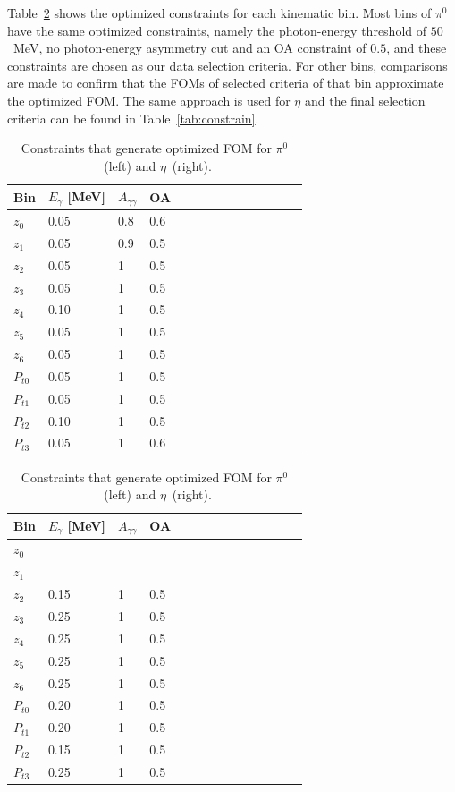 Table~\ref{tab:FOM} shows the optimized constraints for each kinematic bin. Most bins of $\pi^0$ have the same optimized constraints, namely the photon-energy threshold of $50$~MeV, no photon-energy asymmetry cut and an OA constraint of $0.5$, and these constraints are chosen as our data selection criteria. For other bins, comparisons are made to confirm that the FOMs of selected criteria of that bin approximate the optimized FOM. The same approach is used for $\eta$ and the final selection criteria can be found in Table~\ref{tab:constrain}.%
\begin{table}[t]
\begin{tabular}{|p{1.3cm}|l|l|l|l|l|l|l|l|l|l|l|l|l|}
\hline
Bin & $E_{\gamma}$ [MeV] & $A_{\gamma\gamma}$ & OA \\ \hline
$z_0$ & 0.05 & 0.8 & 0.6 \\\hline
$z_1$ & 0.05 & 0.9 & 0.5 \\\hline
$z_2$ & 0.05 & 1 & 0.5 \\\hline
$z_3$ & 0.05 & 1 & 0.5 \\\hline
$z_4$ & 0.10 & 1 & 0.5 \\\hline
$z_5$ & 0.05 & 1 & 0.5 \\\hline
$z_6$ & 0.05 & 1 & 0.5 \\\hline
$P_{t0}$ & 0.05 & 1 & 0.5 \\\hline
$P_{t1}$ & 0.05 & 1 & 0.5 \\\hline
$P_{t2}$ & 0.10 & 1 & 0.5 \\\hline
$P_{t3}$ & 0.05 & 1 & 0.6 \\\hline
\end{tabular}
\quad
\begin{tabular}{|p{1.3cm}|l|l|l|l|l|l|l|l|l|l|l|l|l|}
\hline
Bin & $E_{\gamma}$ [MeV] & $A_{\gamma\gamma}$ & OA \\ \hline
$z_0$ &  &  &  \\\hline
$z_1$ &  &  &  \\\hline
$z_2$ & 0.15 & 1 & 0.5 \\\hline
$z_3$ & 0.25 & 1 & 0.5 \\\hline
$z_4$ & 0.25 & 1 & 0.5 \\\hline
$z_5$ & 0.25 & 1 & 0.5 \\\hline
$z_6$ & 0.25 & 1 & 0.5 \\\hline
$P_{t0}$ & 0.20 & 1 & 0.5 \\\hline
$P_{t1}$ & 0.20 & 1 & 0.5 \\\hline
$P_{t2}$ & 0.15 & 1 & 0.5 \\\hline
$P_{t3}$ & 0.25 & 1 & 0.5 \\\hline
\end{tabular}
\caption[Constraints that generate optimized FOM for $\pi^0$ and $\eta$]{Constraints that generate optimized FOM for $\pi^0$~(left) and $\eta$~(right).}
\label{tab:FOM}
\end{table}


